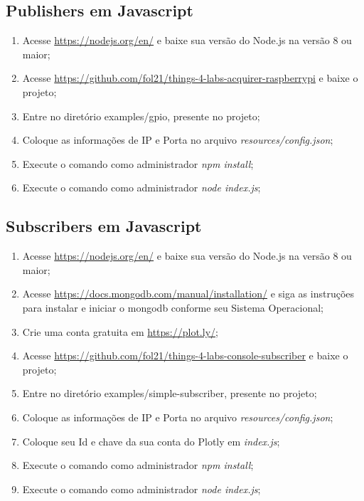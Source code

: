 \subsection{Publishers em Javascript}
\label{subsection:guia_publishers_javascript}

\begin{enumerate}
\item Acesse \url{https://nodejs.org/en/} e baixe sua versão do Node.js na versão 8 ou maior;
\item Acesse \url{https://github.com/fol21/things-4-labs-acquirer-raspberrypi} e baixe o projeto;
\item Entre no diretório examples/gpio, presente no projeto;
\item Coloque as informações de IP e Porta no arquivo \textit{resources/config.json};
\item Execute o comando como administrador \textit{npm install};
\item Execute o comando como administrador \textit{node index.js};

\end{enumerate}


\subsection{Subscribers em Javascript}
\label{subsection:guia_subscribers_javascript}

\begin{enumerate}
\item Acesse \url{https://nodejs.org/en/} e baixe sua versão do Node.js na versão 8 ou maior;
\item Acesse \url{https://docs.mongodb.com/manual/installation/} e siga as instruções para instalar e iniciar o mongodb conforme seu Sistema Operacional;
\item Crie uma conta gratuita em \url{https://plot.ly/};
\item Acesse \url{https://github.com/fol21/things-4-labs-console-subscriber} e baixe o projeto;
\item Entre no diretório examples/simple-subscriber, presente no projeto;
\item Coloque as informações de IP e Porta no arquivo \textit{resources/config.json};
\item Coloque seu Id e chave da sua conta do Plotly em \textit{index.js};
\item Execute o comando como administrador \textit{npm install};
\item Execute o comando como administrador \textit{node index.js};

\end{enumerate}


